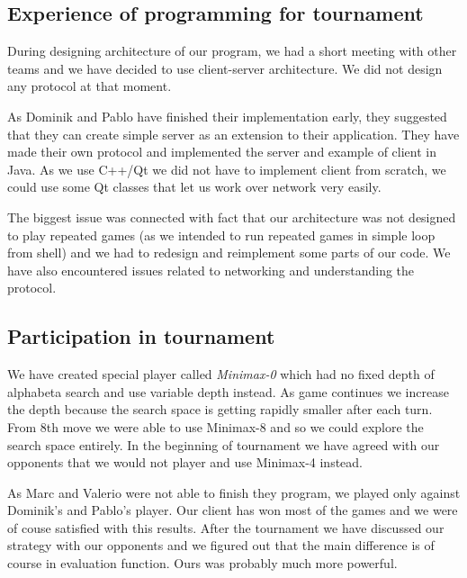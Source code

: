 \documentclass[paper=a4, fontsize=11pt]{article} %
\begin{document}
\subsection{Experience of programming for tournament}
During designing architecture of our program, we had a short  meeting with other teams and we have decided to use client-server architecture. 
We did not design any protocol at that moment.

As Dominik and Pablo have finished their implementation early, they suggested that they can create simple server as an extension to their application. 
They have made their own protocol and implemented the server and example of client in Java. 
As we use C++/Qt we did not have to implement client from scratch, we could use some Qt classes that let us work over network very easily. 

The biggest issue was connected with fact that our architecture was not designed to play repeated games (as we intended to run repeated games in simple loop from shell) and we had to redesign and reimplement some parts of our code. We have also encountered issues related to networking and understanding the protocol.

\subsection{Participation in tournament}
We have created special player called \emph{Minimax-0} which had no fixed depth of alphabeta search and use variable depth instead. As game continues we increase the depth because the search space is getting rapidly smaller after each turn. From 8th move we were able to use Minimax-8 and so we could explore the search space entirely. In the beginning of tournament we have agreed with our opponents that we would not player and use Minimax-4 instead.



As Marc and Valerio were not able to finish they program, we played only against Dominik's and Pablo's player. Our client has won most of the games and we were of couse satisfied with this results. After the tournament we have discussed our strategy with our opponents and we figured out that the main difference is of course in evaluation function. Ours was probably much more powerful.
\end{document}
